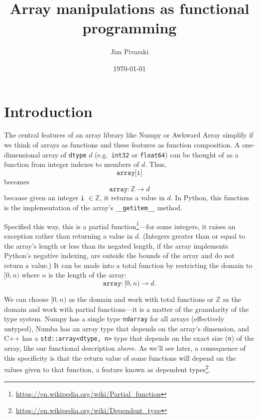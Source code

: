\documentclass[12pt]{article}
\title{Array manipulations as functional programming}
\author{Jim Pivarski}
\date{\today}
\begin{document}
\maketitle

\setlength{\parskip}{0.5\baselineskip}

\section*{Introduction}

The central features of an array library like Numpy or Awkward Array simplify if we think of arrays as functions and these features as function composition. A one-dimensional array of \texttt{dtype} $d$ (e.g.\ \texttt{int32} or \texttt{float64}) can be thought of as a function from integer indexes to members of $d$. Thus,
\[ \texttt{array[i]} \]
\noindent becomes
\[ \texttt{array}: \mathbb{Z} \to d \]
\noindent because given an integer \texttt{i} $\in \mathbb{Z}$, it returns a value in $d$.  In Python, this function is the implementation of the array's \texttt{__getitem__} method.

Specified this way, this is a partial function\footnote{\url{https://en.wikipedia.org/wiki/Partial_function}}---for some integers, it raises an exception rather than returning a value in $d$. (Integers greater than or equal to the array's length or less than its negated length, if the array implements Python's negative indexing, are outside the bounds of the array and do not return a value.) It can be made into a total function by restricting the domain to $[0, n)$ where $n$ is the length of the array:
\[ \texttt{array}: [0, n) \to d. \]

We can choose $[0, n)$ as the domain and work with total functions or $\mathbb{Z}$ as the domain and work with partial functions---it is a matter of the granularity of the type system. Numpy has a single type \texttt{ndarray} for all arrays (effectively untyped), Numba has an array type that depends on the array's dimension, and C++ has a \texttt{std::array<dtype, n>} type that depends on the exact size (\texttt{n}) of the array, like our functional description above. As we'll see later, a consequence of this specificity is that the return value of some functions will depend on the values given to that function, a feature known as dependent types\footnote{\url{https://en.wikipedia.org/wiki/Dependent_type}}.
\end{document}
